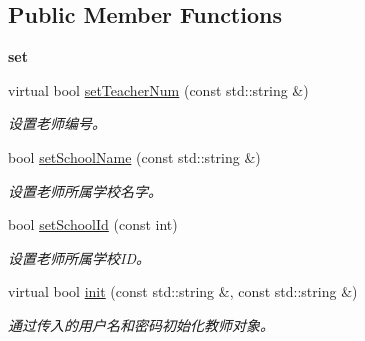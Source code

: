\subsection*{\-Public \-Member \-Functions}
\begin{Indent}{\bf set}\par
\begin{DoxyCompactItemize}
\item 
virtual bool \hyperlink{classepTeacher_a4003ebd5da127bcdc6dcc0ee24f0a7cb}{set\-Teacher\-Num} (const std\-::string \&)
\begin{DoxyCompactList}\small\item\em 设置老师编号。 \end{DoxyCompactList}\item 
bool \hyperlink{classepTeacher_ab5616f3d6c4afe888051331623aad433}{set\-School\-Name} (const std\-::string \&)
\begin{DoxyCompactList}\small\item\em 设置老师所属学校名字。 \end{DoxyCompactList}\item 
bool \hyperlink{classepTeacher_a856ca900f7a3591841bd1ec5590aaab2}{set\-School\-Id} (const int)
\begin{DoxyCompactList}\small\item\em 设置老师所属学校\-I\-D。 \end{DoxyCompactList}\item 
virtual bool \hyperlink{classepTeacher_ae142dcff4c1c8ec7ae66ef27ef1ce520}{init} (const std\-::string \&, const std\-::string \&)
\begin{DoxyCompactList}\small\item\em 通过传入的用户名和密码初始化教师对象。 \end{DoxyCompactList}\end{DoxyCompactItemize}
\end{Indent}
